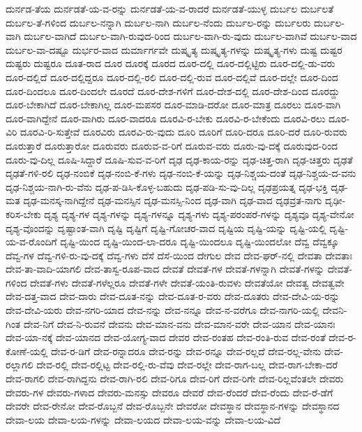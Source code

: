 {ದುರ್ನಡ-ತೆಯ
ದುರ್ನಡತೆ-ಯ-ವ-ರನ್ನು
ದುರ್ನಡತೆ-ಯ-ವ-ರಾದರೆ
ದುರ್ನಡತೆ-ಯುಳ್ಳ
ದುರ್ಬಲ
ದುರ್ಬಲತೆ
ದುರ್ಬಲ-ತೆ-ಗಳಿಂದ
ದುರ್ಬಲ-ನನ್ನಾಗಿ
ದುರ್ಬಲ-ನಾಗಿ
ದುರ್ಬಲ-ನೆಂದು
ದುರ್ಬಲ-ರನ್ನು
ದುರ್ಬಲರು
ದುರ್ಬಲ-ವಾಗಿ
ದುರ್ಬಲ-ವಾಗಿದೆ
ದುರ್ಬಲ-ವಾಗಿ-ರುವುದ-ರಿಂದ
ದುರ್ಬಲ-ವಾಗಿ-ರು-ವುದು
ದುರ್ಬಲ-ವಾಗಿವೆ
ದುರ್ಬಲ-ವಾದ
ದುರ್ಬಲ-ವಾ-ದಷ್ಟೂ
ದುರ್ಭರ-ವಾದ
ದುರ್ಮಾರ್ಗವೇ
ದುಷ್ಕೃತ್ಯ
ದುಷ್ಕೃತ್ಯ-ಗಳನ್ನು
ದುಷ್ಕೃತ್ಯ-ಗಳು
ದುಷ್ಟ
ದುಷ್ಟರ
ದುಷ್ಟರು
ದುಷ್ಟರೂ
ದೂತ-ರಾದ
ದೂರ
ದೂರಕ್ಕೆ
ದೂರದ
ದೂರ-ದಲ್ಲಿ
ದೂರ-ದಲ್ಲಿಟ್ಟಿರು
ದೂರ-ದಲ್ಲಿ-ಡು-ವರು
ದೂರ-ದಲ್ಲಿದೆ
ದೂರ-ದಲ್ಲಿದ್ದರೂ
ದೂರ-ದಲ್ಲಿ-ರಲಿ
ದೂರ-ದಲ್ಲಿ-ರುವ
ದೂರ-ದಲ್ಲಿವೆ
ದೂರ-ದಲ್ಲೇ
ದೂರ-ದಿಂದ
ದೂರ-ದಿಂದಲೂ
ದೂರ-ದಿಂದಲೇ
ದೂರದೆ
ದೂರ-ದೇಶ-ಗಳಿಗೆ
ದೂರ-ದೇಶ-ದಲ್ಲಿ
ದೂರ-ದೇಶ-ದಿಂದ
ದೂರದ್ದು
ದೂರ-ಬೇಕಾಗಿದೆ
ದೂರ-ಬೇಕಾಗಿಲ್ಲ
ದೂರ-ಮಪಸರ
ದೂರ-ಮಾಡಿ-ದರೋ
ದೂರ-ಮಾತ್ರ
ದೂರಲು
ದೂರ-ವಾಗಿ
ದೂರ-ವಾಗಿದ್ದೇನೆ
ದೂರ-ವಾಗಿರು
ದೂರ-ವಾದರೂ
ದೂರವಿ-ರ-ಬೇಕು
ದೂರವಿ-ರ-ಬೇಕೆಂದು
ದೂರವಿ-ರಲು
ದೂರ-ವಿರಿ
ದೂರವಿ-ರಿ-ಸುತ್ತೇವೆ
ದೂರವಿರು
ದೂರವಿ-ರು-ವುದು
ದೂರಿ
ದೂರಿಗೆ
ದೂರಿ-ದರೂ
ದೂರಿ-ದರೆ
ದೂರಿ-ರುವರು
ದೂರುತ್ತಾರೆ
ದೂರುತ್ತಾರೋ
ದೂರುವರು
ದೂರುವ-ವ-ರಿಗೆ
ದೂರುವ-ವರು
ದೂರು-ವು-ದಕ್ಕೆ
ದೂರುವುದ-ರಿಂದ
ದೂರು-ವು-ದಿಲ್ಲ
ದೂಷಿ-ಸಿದ್ದಾರೆ
ದೂಷಿ-ಸುವ-ವ-ರಿಗೆ
ದೃಢ
ದೃಢ-ಕಾಯ-ರನ್ನು
ದೃಢ-ಚಿತ್ತ-ರಾಗಿ
ದೃಢ-ಚಿತ್ತರು
ದೃಢತೆ
ದೃಢತೆ-ಗಳಿ-ರಲಿ
ದೃಢ-ನಂಬಿಕೆ
ದೃಢ-ನಂಬಿ-ಕೆ-ಗಳು
ದೃಢ-ನಂಬಿ-ಕೆ-ಯನ್ನು
ದೃಢ-ನಿಶ್ಚಯ-ದಂತೆ
ದೃಢ-ನಿಶ್ಚಯ-ದ-ವನು
ದೃಢ-ನಿಶ್ಚಯ-ನಾಗಿ-ರು-ವೆನು
ದೃಢ-ಪ-ಡಿಸಿ-ಕೊಳ್ಳ-ಬಹುದು
ದೃಢ-ಪಡಿ-ಸು-ವು-ದಿಲ್ಲ
ದೃಢಪ್ರಯತ್ನ
ದೃಢ-ಭಕ್ತಿ
ದೃಢ-ಮತ
ದೃಢ-ಮನಸ್ಕ-ನಾಗಿದ್ದೇನೆ
ದೃಢ-ಮನಸ್ಸಿನ
ದೃಢ-ಮನಸ್ಸಿ-ನಿಂದ
ದೃಢ-ವಾಗಿ
ದೃಢ-ವಾದ
ದೃಢವ್ರತ-ನಾಗು
ದೃಢೀ-ಕರಿಸ-ಬೇಕು
ದೃಶ್ಯ
ದೃಶ್ಯ-ಗಳ
ದೃಶ್ಯ-ಗಳನ್ನು
ದೃಶ್ಯ-ಗಳನ್ನೂ
ದೃಶ್ಯ-ಗಳು
ದೃಶ್ಯ-ಪರಂಪರೆ-ಗಳನ್ನು
ದೃಶ್ಯವೂ
ದೃಶ್ಯ-ವೇನೋ
ದೃಶ್ಯ-ವೊಂದನ್ನು
ದೃಷ್ಟಾಂತ-ವಾಗಿ
ದೃಷ್ಟಿ
ದೃಷ್ಟಿಗೆ
ದೃಷ್ಟಿ-ಗೋಚರ-ವಾದ
ದೃಷ್ಟಿಯ
ದೃಷ್ಟಿ-ಯನ್ನು
ದೃಷ್ಟಿ-ಯಲ್ಲಿ
ದೃಷ್ಟಿ-ಯ-ವ-ರೊಂದಿಗೆ
ದೃಷ್ಟಿ-ಯಿಂದ
ದೃಷ್ಟಿ-ಯಿಂದ-ಲಾ-ದರೂ
ದೃಷ್ಟಿ-ಯಿಂದಲೂ
ದೃಷ್ಟಿ-ಯಿಂದಲೋ
ದೆವ್ವ
ದೆವ್ವಕ್ಕೂ
ದೆವ್ವ-ಗಳ
ದೆವ್ವ-ಗಳಿ-ರು-ವು-ದಕ್ಕೆ
ದೆವ್ವ-ಗಳು
ದೆಸೆ
ದೆಸೆ-ಯಿಂದ
ದೇಗುಲ
ದೇವ
ದೇವ-ಘರ್-ನಲ್ಲಿ
ದೇವತಾ
ದೇವತಾಃ
ದೇವ-ತಾ-ವಾದಿ-ಯಾಗಲಿ
ದೇವ-ತಾಸ್ವ-ರೂಪ-ವಾದ
ದೇವತೆ
ದೇವತೆ-ಗಳ
ದೇವತೆ-ಗಳನ್ನಾಗಿ
ದೇವತೆ-ಗಳನ್ನು
ದೇವತೆ-ಗಳಿಂದ
ದೇವತೆ-ಗಳು
ದೇವತೆ-ಗಳೆಲ್ಲರೂ
ದೇವತೆ-ಗಳೇ
ದೇವತೆ-ಯಂತಿ-ರುವಳು
ದೇವತೆಯೋ
ದೇವತ್ವ
ದೇವತ್ವವೇ
ದೇವ-ದತ್ತ-ವಾದ
ದೇವ-ದಾರು
ದೇವ-ದೂತ-ನನ್ನು
ದೇವ-ದೂತ-ರ-ವರು
ದೇವ-ದೂತರು
ದೇವ-ದೇವಿ-ಯ-ರನ್ನು
ದೇವ-ದೇವಿ-ಯರು
ದೇವ-ನಗರಿ-ಯಾದ
ದೇವ-ನನ್ನು
ದೇವ-ನನ್ನೂ
ದೇವ-ನ-ವರೆಗೂ
ದೇವ-ನಾಗರಿ-ಯಲ್ಲಿ
ದೇವನಿ-ಗಿಂತ
ದೇವ-ನಿಗೆ
ದೇವ-ನಿ-ರುವನೆ
ದೇವನು
ದೇವ-ಮಾನ-ವನು
ದೇವ-ಮಾನ-ವರೇ
ದೇವ-ಯಾನ
ದೇವ-ಯಾನಃ
ದೇವ-ಯಾ-ನಕ್ಕೆ
ದೇವ-ಯಾನದ
ದೇವ-ಯೋಗ್ಯ-ವಾದ
ದೇವರ
ದೇವ-ರಂತಹ
ದೇವ-ರಂತಿ-ರುವ
ದೇವ-ರಂತೆ
ದೇವ-ರ-ಕೋಣೆ-ಯಲ್ಲಿ
ದೇವ-ರ-ಡಿಗೆ
ದೇವ-ರನ್ನಾದರೂ
ದೇವ-ರನ್ನು
ದೇವ-ರನ್ನೂ
ದೇವ-ರಲ್ಲದೆ
ದೇವ-ರಲ್ಲ-ವೇನು
ದೇವ-ರಲ್ಲಾಗಲಿ
ದೇವ-ರಲ್ಲಿ
ದೇವ-ರಲ್ಲಿಟ್ಟ
ದೇವ-ರಲ್ಲಿ-ರು-ವೆವು
ದೇವ-ರಲ್ಲೇ
ದೇವ-ರಾಗ-ಬಲ್ಲ
ದೇವ-ರಾಗ-ಬೇಕಾ-ದರೆ
ದೇವ-ರಾಗಲಿ
ದೇವ-ರಾಗಿದ್ದನು
ದೇವ-ರಾಗಿ-ರಲಿ
ದೇವ-ರಿಗೂ
ದೇವ-ರಿಗೆ
ದೇವ-ರಿಗೇ
ದೇವ-ರಿಲ್ಲವೆಂತಲೇ
ದೇವರು
ದೇವರು-ಗಳ
ದೇವರು-ಗಳಾದ
ದೇವರು-ಮನಸ್ಸು
ದೇವರೂ
ದೇವರೆ
ದೇವ-ರೆಂದರೆ
ದೇವ-ರೆಂದು
ದೇವ-ರೆ-ಡೆಗೆ
ದೇವರೇ
ದೇವ-ರೇನೋ
ದೇವ-ರೊಬ್ಬನೆ
ದೇವ-ರೊಬ್ಬನೇ
ದೇವರೋ
ದೇವಸ್ಥಾನ
ದೇವಸ್ಥಾನ-ಗಳನ್ನು
ದೇವಸ್ಥಾನದ
ದೇವಾ-ಲಯ
ದೇವಾ-ಲಯ-ಗಳನ್ನು
ದೇವಾ-ಲಯದ
ದೇವಾ-ಲಯ-ವನ್ನು
ದೇವಾ-ಲಯ-ವಿದೆ
}
